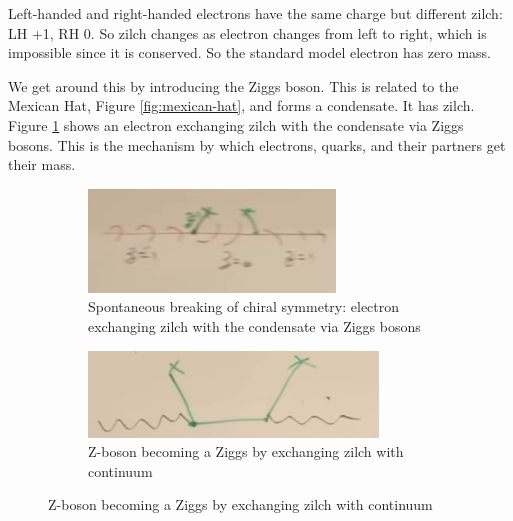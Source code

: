 \documentclass[]{article}
\begin{document}
\begin{appendices}
\begin{figure}[H]
\begin{subfigure}[t]{0.3\textwidth}
		\end{subfigure}	
	\end{figure} 

	Left-handed and right-handed electrons have the same charge but different zilch: LH +1, RH 0. So zilch changes as electron changes from left to right, which is impossible since it is conserved. So the standard model electron has zero mass.
	
	We get around this by introducing the Ziggs boson. This is related to the Mexican Hat, Figure \ref{fig:mexican-hat}, and forms a condensate. It has zilch. Figure \ref{fig:2-a3-zilch} shows an electron exchanging zilch with the condensate via Ziggs bosons. This is the mechanism by which electrons, quarks, and their partners get their mass.
	
	\begin{figure}[H]
		\caption{Spontaneous breaking of chiral symmetry}
		\begin{subfigure}[t]{0.4\textwidth}
			\caption{Spontaneous breaking of chiral symmetry: electron exchanging zilch with the condensate via Ziggs bosons}\label{fig:2-a3-zilch}
			\includegraphics[width=\textwidth]{2-a3-zilch}
		\end{subfigure}
		\begin{subfigure}[t]{0.4\textwidth}
			\caption{Z-boson becoming a Ziggs by exchanging zilch with continuum}\label{fig:2-a3-zilch-Z}
			\includegraphics[width=\textwidth]{2-a3-zilch-Z}
		\end{subfigure}
	\end{figure}
	

\end{appendices}
\end{document}
